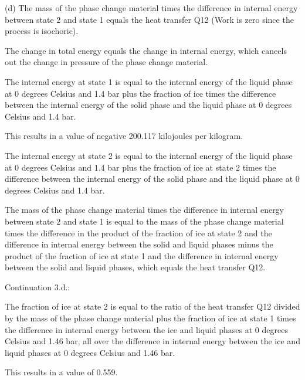 (d) The mass of the phase change material times the difference in internal energy between state 2 and state 1 equals the heat transfer Q12 (Work is zero since the process is isochoric).

The change in total energy equals the change in internal energy, which cancels out the change in pressure of the phase change material.

The internal energy at state 1 is equal to the internal energy of the liquid phase at 0 degrees Celsius and 1.4 bar plus the fraction of ice times the difference between the internal energy of the solid phase and the liquid phase at 0 degrees Celsius and 1.4 bar.

This results in a value of negative 200.117 kilojoules per kilogram.

The internal energy at state 2 is equal to the internal energy of the liquid phase at 0 degrees Celsius and 1.4 bar plus the fraction of ice at state 2 times the difference between the internal energy of the solid phase and the liquid phase at 0 degrees Celsius and 1.4 bar.

The mass of the phase change material times the difference in internal energy between state 2 and state 1 is equal to the mass of the phase change material times the difference in the product of the fraction of ice at state 2 and the difference in internal energy between the solid and liquid phases minus the product of the fraction of ice at state 1 and the difference in internal energy between the solid and liquid phases, which equals the heat transfer Q12.

Continuation 3.d.:

The fraction of ice at state 2 is equal to the ratio of the heat transfer Q12 divided by the mass of the phase change material plus the fraction of ice at state 1 times the difference in internal energy between the ice and liquid phases at 0 degrees Celsius and 1.46 bar, all over the difference in internal energy between the ice and liquid phases at 0 degrees Celsius and 1.46 bar.

This results in a value of 0.559.